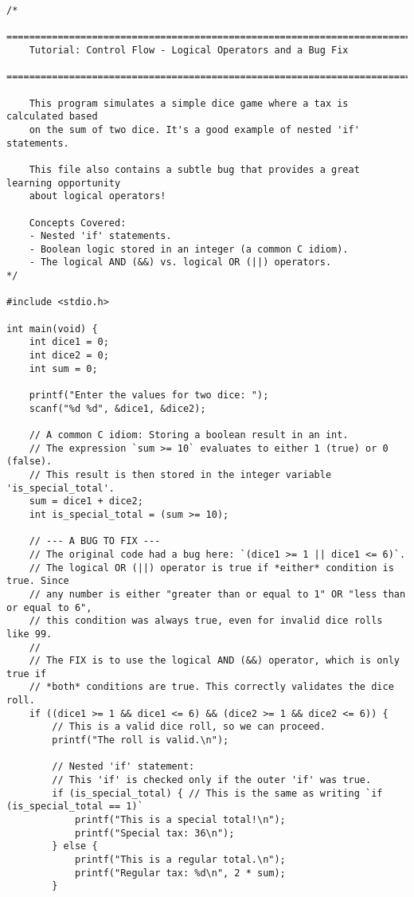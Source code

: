 \documentclass[11pt]{book}
\begin{document}
\clearpage
\begin{verbatim}
/*
    ================================================================================
    Tutorial: Control Flow - Logical Operators and a Bug Fix
    ================================================================================

    This program simulates a simple dice game where a tax is calculated based
    on the sum of two dice. It's a good example of nested 'if' statements.

    This file also contains a subtle bug that provides a great learning opportunity
    about logical operators!

    Concepts Covered:
    - Nested 'if' statements.
    - Boolean logic stored in an integer (a common C idiom).
    - The logical AND (&&) vs. logical OR (||) operators.
*/

#include <stdio.h>

int main(void) {
    int dice1 = 0;
    int dice2 = 0;
    int sum = 0;

    printf("Enter the values for two dice: ");
    scanf("%d %d", &dice1, &dice2);

    // A common C idiom: Storing a boolean result in an int.
    // The expression `sum >= 10` evaluates to either 1 (true) or 0 (false).
    // This result is then stored in the integer variable 'is_special_total'.
    sum = dice1 + dice2;
    int is_special_total = (sum >= 10);

    // --- A BUG TO FIX ---
    // The original code had a bug here: `(dice1 >= 1 || dice1 <= 6)`.
    // The logical OR (||) operator is true if *either* condition is true. Since
    // any number is either "greater than or equal to 1" OR "less than or equal to 6",
    // this condition was always true, even for invalid dice rolls like 99.
    //
    // The FIX is to use the logical AND (&&) operator, which is only true if
    // *both* conditions are true. This correctly validates the dice roll.
    if ((dice1 >= 1 && dice1 <= 6) && (dice2 >= 1 && dice2 <= 6)) {
        // This is a valid dice roll, so we can proceed.
        printf("The roll is valid.\n");

        // Nested 'if' statement:
        // This 'if' is checked only if the outer 'if' was true.
        if (is_special_total) { // This is the same as writing `if (is_special_total == 1)`
            printf("This is a special total!\n");
            printf("Special tax: 36\n");
        } else {
            printf("This is a regular total.\n");
            printf("Regular tax: %d\n", 2 * sum);
        }


\end{verbatim}
\end{document}
